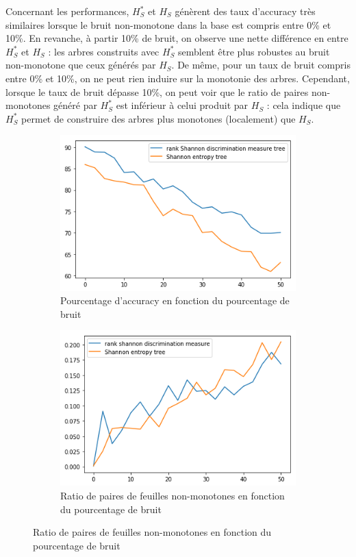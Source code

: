 \documentclass[a4paper]{article}
\begin{document}
Concernant les performances, $H^*_S$ et $H_S$ génèrent des taux d'accuracy très
similaires lorsque le bruit non-monotone dans la base est compris entre 0\% et
10\%. En revanche, à partir 10\% de bruit, on observe une nette différence en
entre $H^*_S$ et $H_S$ : les arbres construits avec $H^*_S$ semblent être plus
robustes au bruit non-monotone que ceux générés par $H_S$. De même, pour un taux
de bruit compris entre 0\% et 10\%, on ne peut rien induire sur la monotonie des
arbres. Cependant, lorsque le taux de bruit dépasse 10\%, on peut voir que le
ratio de paires non-monotones généré par $H^*_S$ est inférieur à celui produit
par $H_S$ : cela indique que $H^*_S$ permet de construire des arbres plus
monotones (localement) que $H_S$.

\begin{figure}[H]
    \centering
    \begin{subfigure}[c]{0.46\textwidth}
        \centering
        \includegraphics[width=\textwidth]{images/cci_3.png}
        \caption{Pourcentage d'accuracy en fonction du pourcentage de bruit}
    \end{subfigure}
    \begin{subfigure}[c]{0.46\textwidth}
        \centering
        \includegraphics[width=\textwidth]{images/ratio_3.png}
        \caption{Ratio de paires de feuilles non-monotones en fonction du pourcentage de bruit}
    \end{subfigure}


\end{figure}
\end{document}

